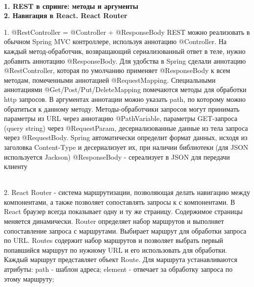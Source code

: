 \documentclass{article}
\newcommand{\bil}[4]{%
    \begin{minipage}{.3\textwidth}
        \textbf{1. #1} \\
        \textbf{2. #2}

        1. #3
        \\
        2. #4
    \end{minipage}
}
\begin{document}
\\
\bil{REST в спринге: методы и аргументы}{Навигация в React. React Router}{
    @RestController = @Controller + @ResponseBody
	REST можно реализовать в обычном Spring MVC контроллере, используя аннотацию @Controller. На каждый метод-обработчик, возвращающий сериализованный ответ в теле, нужно добавить аннотацию @ResponseBody. 
    Для удобства в Spring сделали аннотацию @RestController, которая по умолчанию применяет @ResponseBody к всем методам, помеченными аннотацией @RequestMapping. 
    Специальными аннотациями @Get/Post/Put/DeleteMapping помечаются методы для обработки http запросов. 
    В аргументах аннотации можно указать path, по которому можно обратиться к данному методу.  
    Методы-обработчики запросов могут принимать параметры из URL через аннотацию @PathVariable, параметры GET-запроса (query string) через @RequestParam, десериализованные данные из тела запроса через @RequestBody. 
    Spring автоматически определит формат данных, исходя из заголовка Content-Type и десериализует их, при наличии библиотеки (для JSON используется Jackson)
    @ResponseBody - сереализует в JSON для передачи клиенту
}{
    React Router - система маршрутизации, позволяющая делать навигацию между компонентами, а также позволяет сопоставлять запросы к с компонентами. 
    В React браузер всегда показывает одну и ту же страницу. Содержимое страницы меняется динамически. 
    Router определяет набор маршрутов и выполняет сопоставление запроса с маршрутами. 
    Выбирает маршрут для обработки запроса по URL.
    Routes содержит набор маршрутов и позволяет выбрать первый попавшийся маршрут по нужному URL и его использовать для обработки.
    Каждый маршрут представляет объект Route. Для маршрута устанавливаются атрибуты:
    path - шаблон адреса;
    element - отвечает за обработку запроса по этому маршруту;
}
\hfill
\end{document}
